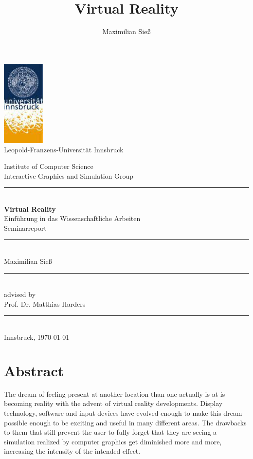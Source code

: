 \documentclass[11pt]{article}
\newcommand{\whitespace}{\rule{\linewidth}{0.0mm}}
\begin{document}
\title{Virtual Reality}
\author{Maximilian Sieß}

\begin{titlepage}
	\begin{center}
		\includegraphics[scale=1]{images/uibk} \\
		Leopold-Franzens-Universität Innsbruck
		\linebreak 

		Institute of Computer Science \\
		Interactive Graphics and Simulation Group
	
		\whitespace \\[2.0cm]
		\LARGE \textbf{Virtual Reality}\\
		\normalsize Einführung in das Wissenschaftliche Arbeiten\\
		Seminarreport
	
		\whitespace \\[0.8cm]
		Maximilian Sieß
		
		\whitespace \\[2.0cm]
		advised by\\
		Prof. Dr. Matthias Harders
		
		\whitespace \\[4.0cm]
		Innsbruck, \today

	\end{center}
\end{titlepage}




\newpage
\section{Abstract}
The dream of feeling present at another location than one actually is at is becoming reality with the advent of virtual reality developments. Display technology, software and input devices have evolved enough to make this dream possible enough to be exciting and useful in many different areas. The drawbacks to them that still prevent the user to fully forget that they are seeing a simulation realized by computer graphics get diminished more and more, increasing the intensity of the intended effect.
\end{document}
